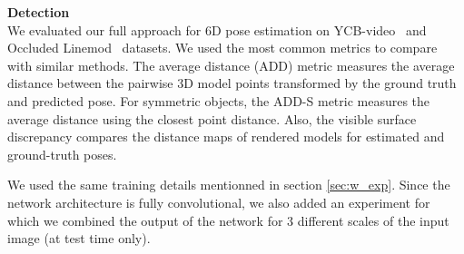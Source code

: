 \documentclass[letterpaper, 10 pt, conference]{ieeeconf}  %
\begin{document}
\textbf{Detection}\\%
We evaluated our full approach for 6D pose estimation on YCB-video~\cite{xiang2017posecnn} and Occluded Linemod~\cite{krull2015learning} datasets. We used the most common metrics to compare with similar methods. The average distance (ADD) metric \cite{hinterstoisser2012model} measures the average distance between the pairwise 3D model points transformed by the ground truth and predicted pose. For symmetric objects, the ADD-S metric measures the average distance using the closest point distance. Also, the visible surface discrepancy \cite{hodan2018bop} compares the distance maps of rendered models for estimated and ground-truth poses.

We used the same training details mentionned in section \ref{sec:w_exp}. Since the network architecture is fully convolutional, we also added an experiment for which we combined the output of the network for 3 different scales of the input image (at test time only).
\end{document}
